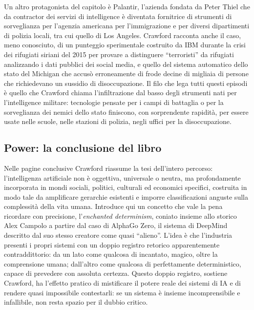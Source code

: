 \documentclass[a4paper,11pt]{article}
\begin{document}
Un altro protagonista del capitolo è Palantir, l'azienda fondata da Peter Thiel che da contractor dei servizi di intelligence è diventata fornitrice di strumenti di sorveglianza per l'agenzia americana per l'immigrazione e per diversi dipartimenti di polizia locali, tra cui quello di Los Angeles. Crawford racconta anche il caso, meno conosciuto, di un punteggio sperimentale costruito da IBM durante la crisi dei rifugiati siriani del 2015 per provare a distinguere ``terroristi'' da rifugiati analizzando i dati pubblici dei social media, e quello del sistema automatico dello stato del Michigan che accusò erroneamente di frode decine di migliaia di persone che richiedevano un sussidio di disoccupazione. Il filo che lega tutti questi episodi è quello che Crawford chiama l'infiltrazione dal basso degli strumenti nati per l'intelligence militare: tecnologie pensate per i campi di battaglia o per la sorveglianza dei nemici dello stato finiscono, con sorprendente rapidità, per essere usate nelle scuole, nelle stazioni di polizia, negli uffici per la disoccupazione.

\subsection{Power: la conclusione del libro}

Nelle pagine conclusive Crawford riassume la tesi dell'intero percorso: l'intelligenza artificiale non è oggettiva, universale o neutra, ma profondamente incorporata in mondi sociali, politici, culturali ed economici specifici, costruita in modo tale da amplificare gerarchie esistenti e imporre classificazioni anguste sulla complessità della vita umana. Introduce qui un concetto che vale la pena ricordare con precisione, l'\emph{enchanted determinism}, coniato insieme allo storico Alex Campolo a partire dal caso di AlphaGo Zero, il sistema di DeepMind descritto dal suo stesso creatore come quasi ``alieno''. L'idea è che l'industria presenti i propri sistemi con un doppio registro retorico apparentemente contraddittorio: da un lato come qualcosa di incantato, magico, oltre la comprensione umana; dall'altro come qualcosa di perfettamente deterministico, capace di prevedere con assoluta certezza. Questo doppio registro, sostiene Crawford, ha l'effetto pratico di mistificare il potere reale dei sistemi di IA e di rendere quasi impossibile contestarli: se un sistema è insieme incomprensibile e infallibile, non resta spazio per il dubbio critico.
\end{document}
